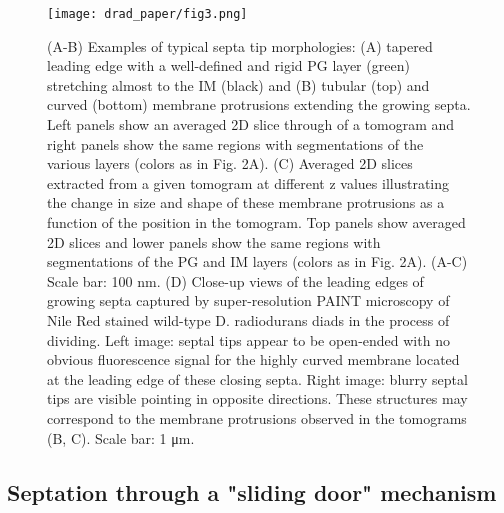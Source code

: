 \begin{figure}[ht]
    \centering
    \texttt{[image: drad\_paper/fig3.png]}
    \label{drad_fig3}
\end{figure}
\begin{figure}[ht]
    \ContinuedFloat
    \caption[]{(A-B) Examples of typical septa tip morphologies: (A) tapered leading edge with a well-defined and rigid PG layer (green) stretching almost to the IM (black) and (B) tubular (top) and curved (bottom) membrane protrusions extending the growing septa. Left panels show an averaged 2D slice through of a tomogram and right panels show the same regions with segmentations of the various layers (colors as in Fig. 2A). (C) Averaged 2D slices extracted from a given tomogram at different z values illustrating the change in size and shape of these membrane protrusions as a function of the position in the tomogram. Top panels show averaged 2D slices and lower panels show the same regions with segmentations of the PG and IM layers (colors as in Fig. 2A). (A-C) Scale bar: 100 nm. (D) Close-up views of the leading edges of growing septa captured by super-resolution PAINT microscopy of Nile Red stained wild-type D. radiodurans diads in the process of dividing. Left image: septal tips appear to be open-ended with no obvious fluorescence signal for the highly curved membrane located at the leading edge of these closing septa. Right image: blurry septal tips are visible pointing in opposite directions. These structures may correspond to the membrane protrusions observed in the tomograms (B, C). Scale bar: 1 μm.}
\end{figure}

\FloatBarrier

\subsection{Septation through a "sliding door" mechanism}

